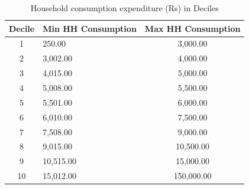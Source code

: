\vspace{1em}
\begin{table}[H]
\centering
\caption{Household consumption expenditure (Rs) in Deciles}
\begin{tabular}{clc}
\toprule
Decile & Min HH Consumption & Max HH Consumption  \\
\midrule
1&250.00&3,000.00\\
2&3,002.00&4,000.00\\
3&4,015.00&5,000.00\\
4&5,008.00&5,500.00\\
5&5,501.00&6,000.00\\
6&6,010.00&7,500.00\\
7&7,508.00&9,000.00\\
8&9,015.00&10,500.00\\
9&10,515.00&15,000.00\\
10&15,012.00&150,000.00\\
\bottomrule
\end{tabular}
\end{table}
